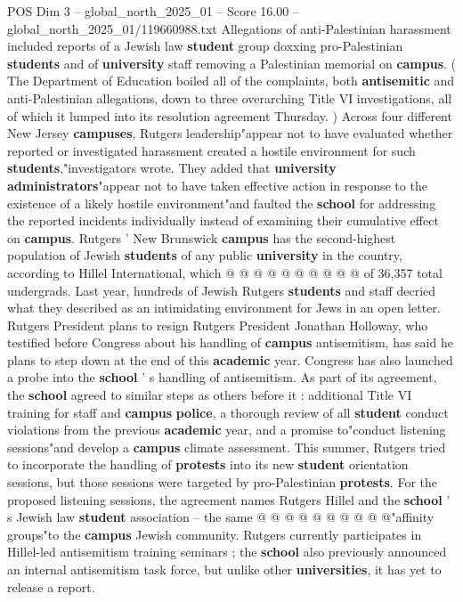 \begin{textsample}{POS Dim 3 – global\_north\_2025\_01 – Score 16.00 – global\_north\_2025\_01/119660988.txt}
Allegations of anti-Palestinian harassment included reports of a Jewish law \textbf{student} group doxxing pro-Palestinian \textbf{students} and of \textbf{university} staff removing a Palestinian memorial on \textbf{campus}. ( The Department of Education boiled all of the complaints, both \textbf{antisemitic} and anti-Palestinian allegations, down to three overarching Title VI investigations, all of which it lumped into its resolution agreement Thursday. ) Across four different New Jersey \textbf{campuses}, Rutgers leadership"appear not to have evaluated whether reported or investigated harassment created a hostile environment for such \textbf{students},"investigators wrote.
They added that \textbf{university} \textbf{administrators}"appear not to have taken effective action in response to the existence of a likely hostile environment"and faulted the \textbf{school} for addressing the reported incidents individually instead of examining their cumulative effect on \textbf{campus}.
Rutgers ' New Brunswick \textbf{campus} has the second-highest population of Jewish \textbf{students} of any public \textbf{university} in the country, according to Hillel International, which @ @ @ @ @ @ @ @ @ @ of 36,357 total undergrads.
Last year, hundreds of Jewish Rutgers \textbf{students} and staff decried what they described as an intimidating environment for Jews in an open letter.
Rutgers President plans to resign Rutgers President Jonathan Holloway, who testified before Congress about his handling of \textbf{campus} antisemitism, has said he plans to step down at the end of this \textbf{academic} year.
Congress has also launched a probe into the \textbf{school} ' s handling of antisemitism.
As part of its agreement, the \textbf{school} agreed to similar steps as others before it : additional Title VI training for staff and \textbf{campus} \textbf{police}, a thorough review of all \textbf{student} conduct violations from the previous \textbf{academic} year, and a promise to"conduct listening sessions"and develop a \textbf{campus} climate assessment.
This summer, Rutgers tried to incorporate the handling of \textbf{protests} into its new \textbf{student} orientation sessions, but those sessions were targeted by pro-Palestinian \textbf{protests}.
For the proposed listening sessions, the agreement names Rutgers Hillel and the \textbf{school} ' s Jewish law \textbf{student} association -- the same @ @ @ @ @ @ @ @ @ @"affinity groups"to the \textbf{campus} Jewish community.
Rutgers currently participates in Hillel-led antisemitism training seminars ; the \textbf{school} also previously announced an internal antisemitism task force, but unlike other \textbf{universities}, it has yet to release a report.

\end{textsample}
